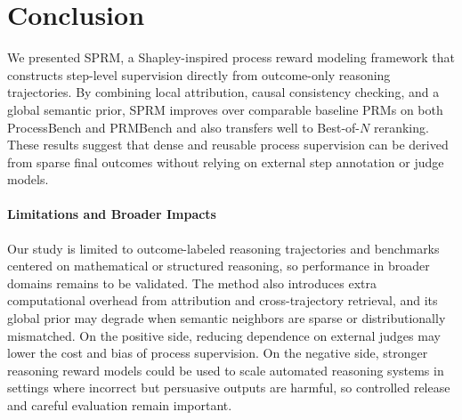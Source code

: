 \section{Conclusion}
We presented SPRM, a Shapley-inspired process reward modeling framework that
constructs step-level supervision directly from outcome-only reasoning
trajectories.
By combining local attribution, causal consistency checking, and a global
semantic prior, SPRM improves over comparable baseline PRMs on both
ProcessBench and PRMBench and also transfers well to Best-of-\(N\) reranking.
These results suggest that dense and reusable process supervision can be
derived from sparse final outcomes without relying on external step annotation
or judge models.

\paragraph{Limitations and Broader Impacts}
Our study is limited to outcome-labeled reasoning trajectories and benchmarks
centered on mathematical or structured reasoning, so performance in broader
domains remains to be validated.
The method also introduces extra computational overhead from attribution and
cross-trajectory retrieval, and its global prior may degrade when semantic
neighbors are sparse or distributionally mismatched.
On the positive side, reducing dependence on external judges may lower the cost
and bias of process supervision.
On the negative side, stronger reasoning reward models could be used to scale
automated reasoning systems in settings where incorrect but persuasive outputs
are harmful, so controlled release and careful evaluation remain important.